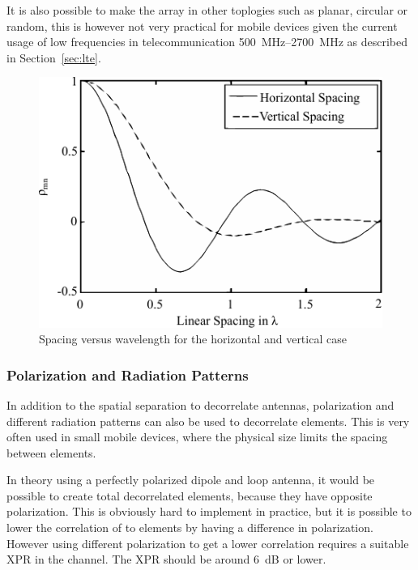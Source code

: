 It is also possible to make the array in other toplogies such as planar, circular or random, this is however not very practical for mobile devices given the current usage of low frequencies in telecommunication \SIrange{500}{2700}{MHz} as described in Section~\ref{sec:lte}.

\begin{figure}[htbp]
  \centering
  \includegraphics[scale=1.2]{img/analysis/mimoSpacing}
  \caption{Spacing versus wavelength for the horizontal and vertical case\cite{Tim2012Practical}}
  \label{fig:mimo-spacing}
\end{figure}

\subsubsection{Polarization and Radiation Patterns}
In addition to the spatial separation to decorrelate antennas, polarization and different radiation patterns can also be used to decorrelate elements. This is very often used in small mobile devices, where the physical size limits the spacing between elements.  

In theory using a perfectly polarized dipole and loop antenna, it would be possible to create total decorrelated elements, because they have opposite polarization. This is obviously hard to implement in practice, but it is possible to lower the correlation of to elements by having a difference in polarization. However using different polarization to get a lower correlation requires a suitable XPR in the channel. The XPR should be around \SI{6}{dB} or lower\cite{Tim2012Practical}. 
